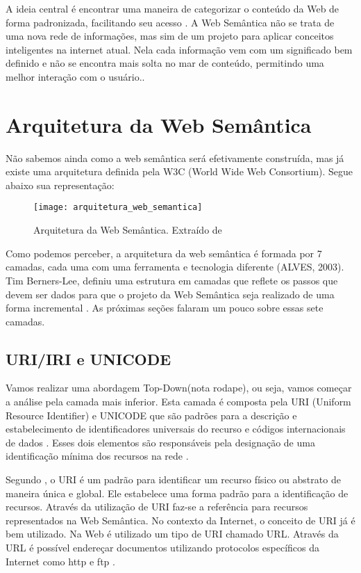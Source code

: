 A ideia central é encontrar uma maneira de categorizar o conteúdo da Web de forma padronizada, facilitando seu acesso \cite{kbreitman}. A Web Semântica não se trata de uma nova rede de informações, mas sim de um projeto para aplicar conceitos inteligentes na internet atual. Nela cada informação vem com um significado bem definido e não se encontra mais solta no mar de conteúdo, permitindo uma melhor interação com o usuário.\cite{websemtecmundo}.


\section{Arquitetura da Web Semântica}

Não sabemos ainda como a web semântica será efetivamente construída, mas já existe uma arquitetura definida pela W3C (World Wide Web Consortium). Segue abaixo sua representação:

\graphicspath{{figuras/}}
\begin{figure}[H]
\centering
\texttt{[image: arquitetura\_web\_semantica]}
\caption[Arquitetura da Web Semântica]{Arquitetura da Web Semântica. Extraído de \cite{fig-arqweb}}
\label{arq_web_sem}
\end{figure}

Como podemos perceber, a arquitetura da web semântica é formada por 7 camadas, cada uma com uma ferramenta e tecnologia diferente (ALVES, 2003). Tim Berners-Lee, definiu uma estrutura em camadas que reflete os passos que devem ser dados para que o projeto da Web Semântica seja realizado de uma forma incremental \cite{ferneda}. As próximas seções falaram um pouco sobre essas sete camadas.

\subsection{URI/IRI e UNICODE}

Vamos realizar uma abordagem Top-Down(nota rodape), ou seja, vamos começar a análise pela camada mais inferior. Esta camada é composta pela URI (Uniform Resource Identifier) e UNICODE que são padrões para a descrição e estabelecimento de identificadores universais do recurso e códigos internacionais de dados \cite{santarem}. Esses dois elementos são responsáveis pela designação de uma identificação mínima dos recursos na rede \cite{vesu}.

Segundo \cite{elementoswebsem}, o URI é um padrão para identificar um recurso físico ou abstrato de maneira única e global. Ele estabelece uma forma padrão para a identificação de recursos. Através da utilização de URI faz-se a referência para recursos representados na Web Semântica. No contexto da Internet, o conceito de URI já é bem utilizado. Na Web é utilizado um tipo de URI chamado URL. Através da URL é possível endereçar documentos utilizando protocolos específicos da Internet como http e ftp \cite{rosa}.

